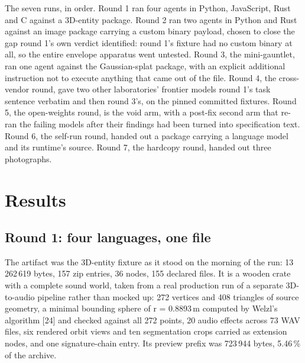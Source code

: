 \documentclass[10pt,twocolumn,letterpaper]{article}
\begin{document}
The seven runs, in order. Round 1 ran four agents in Python, JavaScript, Rust and C against a 3D-entity package. Round 2 ran two agents in Python and Rust against an image package carrying a custom binary payload, chosen to close the gap round 1's own verdict identified: round 1's fixture had no custom binary at all, so the entire envelope apparatus went untested. Round 3, the mini-gauntlet, ran one agent against the Gaussian-splat package, with an explicit additional instruction not to execute anything that came out of the file. Round 4, the cross-vendor round, gave two other laboratories' frontier models round 1's task sentence verbatim and then round 3's, on the pinned committed fixtures. Round 5, the open-weights round, is the void arm, with a post-fix second arm that re-ran the failing models after their findings had been turned into specification text. Round 6, the self-run round, handed out a package carrying a language model and its runtime's source. Round 7, the hardcopy round, handed out three photographs.

\section{Results}

\subsection{Round 1: four languages, one file}

The artifact was the 3D-entity fixture as it stood on the morning of the run: 13\,262\,619 bytes, 157 zip entries, 36 nodes, 155 declared files. It is a wooden crate with a complete sound world, taken from a real production run of a separate 3D-to-audio pipeline rather than mocked up: 272 vertices and 408 triangles of source geometry, a minimal bounding sphere of r = 0.8893\,m computed by Welzl's algorithm [24] and checked against all 272 points, 20 audio effects across 73 WAV files, six rendered orbit views and ten segmentation crops carried as extension nodes, and one signature-chain entry. Its preview prefix was 723\,944 bytes, 5.46\,\% of the archive.
\end{document}
